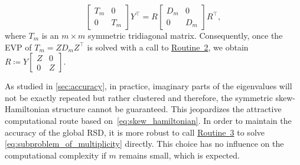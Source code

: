 \documentclass[10pt,twoside,dvipsnames]{siamart1116}
\numberwithin{algorithm}{section}
\numberwithin{equation}{section}
\newcommand{\wordref}[2]{\hyperlink{#1}{#2}}
\begin{document}
\begin{enumerate}
\begin{equation}
\begin{bmatrix}
			T_m&0\\
			0&T_m
			\end{bmatrix}Y^\top  = R\begin{bmatrix}
	 D_m&0\\
	 0&D_m
	 \end{bmatrix}R^\top ,
		\end{equation}
		where $T_m$ is an $m\times m$ symmetric tridiagonal matrix. Consequently, once the EVP of $T_m=Z D_m Z^\top $ is solved with a call to \wordref{oracle2}{Routine~2}, we obtain $R\coloneq Y\left[\begin{smallmatrix}Z&0\\ 0 &Z\end{smallmatrix}\right]$.
		
		As studied in \cref{sec:accuracy}, in practice, imaginary parts of the eigenvalues will not be exactly repeated but rather clustered and therefore, the symmetric skew-Hamiltonian structure cannot be guaranteed. This jeopardizes the attractive computational route based on~\eqref{eq:skew_hamiltonian}. In order to maintain the accuracy of the global RSD, it is more robust to call \wordref{oracle3}{Routine~3} to solve \eqref{eq:subproblem_of_multiplicity} directly. This choice has no influence on the computational complexity if $m$ remains small, which is expected. %
	\end{enumerate}
	
\end{document}
